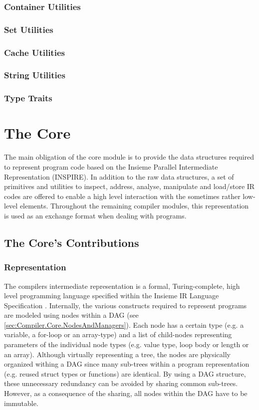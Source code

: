 \subsubsection{Container Utilities}
\subsubsection{Set Utilities}
\subsubsection{Cache Utilities}
\subsubsection{String Utilities}
\subsubsection{Type Traits}

\section{The Core}
The main obligation of the core module is to provide the data structures
required to represent program code based on the Insieme Parallel Intermediate
Representation (INSPIRE). In addition to the raw data structures, a set of
primitives and utilities to inspect, address, analyse, manipulate and load/store
IR codes are offered to enable a high level interaction with the sometimes rather
low-level elements. Throughout the remaining compiler modules, this
representation is used as an exchange format when dealing with programs.

\subsection{The Core's Contributions}
\subsubsection{Representation}
The compilers intermediate representation is a formal, Turing-complete,
high level programming language specified within the Insieme IR
Language Specification \cite{insieme_ir_spec}. Internally, the various
constructs required to represent programs are modeled using nodes within a DAG 
(see \ref{sec:Compiler.Core.NodesAndManagers}). Each node has a certain type
(e.g. a variable, a for-loop or an array-type) and a list of child-nodes
representing parameters of the individual node types (e.g. value type, loop
body or length or an array). Although virtually representing a tree, the nodes
are physically organized withing a DAG since many sub-trees within a program
representation (e.g. reused struct types or functions) are identical. By using a
DAG structure, these unnecessary redundancy can be avoided by sharing common
sub-trees. However, as a consequence of the sharing, all nodes within the DAG
have to be immutable.


